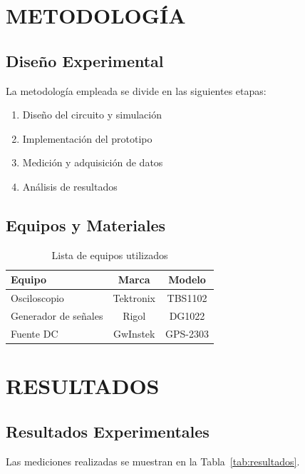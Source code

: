 \documentclass[conference, letterpaper, 10pt]{IEEEtran}
\begin{document}
\section{METODOLOGÍA}

\subsection{Diseño Experimental}
La metodología empleada se divide en las siguientes etapas:

\begin{enumerate}
    \item Diseño del circuito y simulación
    \item Implementación del prototipo
    \item Medición y adquisición de datos
    \item Análisis de resultados
\end{enumerate}

\subsection{Equipos y Materiales}
\begin{table}[H]
    \centering
    \caption{Lista de equipos utilizados}
    \begin{tabular}{@{}lcc@{}}
        \toprule
        \textbf{Equipo} & \textbf{Marca} & \textbf{Modelo} \\
        \midrule
        Osciloscopio & Tektronix & TBS1102 \\
        Generador de señales & Rigol & DG1022 \\
        Fuente DC & GwInstek & GPS-2303 \\
        \bottomrule
    \end{tabular}
    \label{tab:equipos}
\end{table}

\section{RESULTADOS}

\subsection{Resultados Experimentales}
Las mediciones realizadas se muestran en la Tabla~\ref{tab:resultados}.
\end{document}
